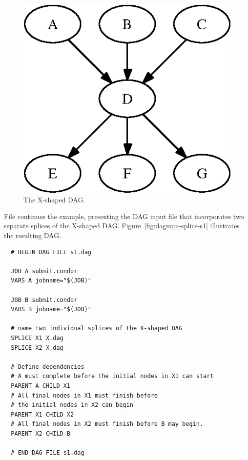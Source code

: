 \begin{figure}
\centering
\includegraphics{user-man/splice-X.eps}
\caption{\label{fig:dagman-splice-X} The X-shaped DAG.}
\end{figure}


File  continues the example, presenting
the DAG input file that
incorporates two separate splices of the X-shaped DAG.
Figure~\ref{fig:dagman-splice-s1} illustrates the resulting DAG.

\begin{verbatim}
  # BEGIN DAG FILE s1.dag

  JOB A submit.condor
  VARS A jobname="$(JOB)"

  JOB B submit.condor
  VARS B jobname="$(JOB)"

  # name two individual splices of the X-shaped DAG
  SPLICE X1 X.dag
  SPLICE X2 X.dag

  # Define dependencies
  # A must complete before the initial nodes in X1 can start
  PARENT A CHILD X1
  # All final nodes in X1 must finish before 
  # the initial nodes in X2 can begin
  PARENT X1 CHILD X2
  # All final nodes in X2 must finish before B may begin.
  PARENT X2 CHILD B

  # END DAG FILE s1.dag
\end{verbatim}

